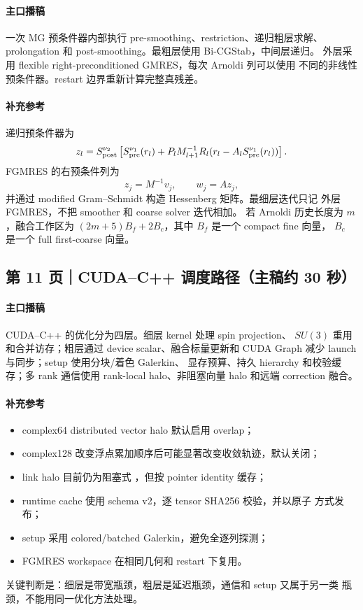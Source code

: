 \documentclass[UTF8,a4paper,11pt,fontset=none]{ctexart}
\newcommand{\code}[1]{\texttt{\detokenize{#1}}}
\begin{document}
\paragraph{主口播稿}
一次 MG 预条件器内部执行 pre-smoothing、restriction、递归粗层求解、
prolongation 和 post-smoothing。最粗层使用 Bi-CGStab，中间层递归。
外层采用 flexible right-preconditioned GMRES，每次 Arnoldi 列可以使用
不同的非线性预条件器。restart 边界重新计算完整真残差。

\paragraph{补充参考}
递归预条件器为
\begin{equation}
z_l=S_{\rm post}^{\nu_2}\left[
S_{\rm pre}^{\nu_1}(r_l)
+P_lM_{l+1}^{-1}R_l(r_l-A_lS_{\rm pre}^{\nu_1}(r_l))
\right].
\end{equation}
FGMRES 的右预条件列为
\[
z_j=M^{-1}v_j,\qquad w_j=A z_j,
\]
并通过 modified Gram--Schmidt 构造 Hessenberg 矩阵。最细层迭代只记
外层 FGMRES，不把 smoother 和 coarse solver 迭代相加。
若 Arnoldi 历史长度为 \(m\)，融合工作区为
\((2m+5)B_f+2B_c\)，其中 \(B_f\) 是一个 compact fine 向量，
\(B_c\) 是一个 full first-coarse 向量。

\subsection{第 11 页｜CUDA--C++ 调度路径（主稿约 30 秒）}

\paragraph{主口播稿}
CUDA--C++ 的优化分为四层。细层 kernel 处理 spin projection、
\(SU(3)\) 重用和合并访存；粗层通过 device scalar、融合标量更新和
CUDA Graph 减少 launch 与同步；setup 使用分块/着色 Galerkin、
显存预算、持久 hierarchy 和校验缓存；多 rank 通信使用 rank-local
halo、非阻塞向量 halo 和远端 correction 融合。

\paragraph{补充参考}
\begin{itemize}
  \item complex64 distributed vector halo 默认启用 overlap；
  \item complex128 改变浮点累加顺序后可能显著改变收敛轨迹，默认关闭；
  \item link halo 目前仍为阻塞式 \code{Sendrecv}，但按 pointer identity
        缓存；
  \item runtime cache 使用 schema v2，逐 tensor SHA256 校验，并以原子
        方式发布；
  \item setup 采用 colored/batched Galerkin，避免全逐列探测；
  \item FGMRES workspace 在相同几何和 restart 下复用。
\end{itemize}
关键判断是：细层是带宽瓶颈，粗层是延迟瓶颈，通信和 setup 又属于另一类
瓶颈，不能用同一优化方法处理。
\end{document}
